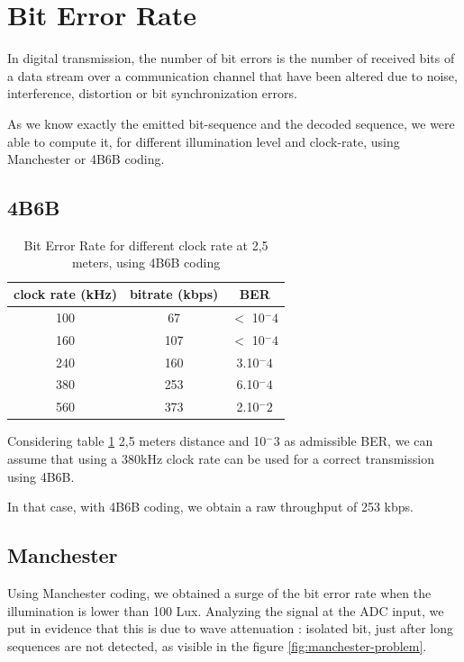 \section{Bit Error Rate}

In digital transmission, the number of bit errors is the number of received bits of a data stream over a communication channel that have been altered due to noise, interference, distortion or bit synchronization errors.

As we know exactly the emitted bit-sequence and the decoded sequence, we were able to compute it, for different illumination level and clock-rate, using Manchester or 4B6B coding.

\subsection{4B6B}

\begin{table}[htbp]
\begin{center}
\begin{tabular}{|c|c|c|}
  \hline
  clock rate (kHz) & bitrate (kbps) & BER \\
  \hline
  100 & 67 & $<$ 10$^-4$ \\
  160 & 107 & $<$ 10$^-4$ \\
  240 & 160 & 3.10$^-4$ \\
  380 & 253 & 6.10$^-4$ \\
  560 & 373 & 2.10$^-2$ \\
  \hline
\end{tabular}
\end{center}
\caption{Bit Error Rate for different clock rate at 2,5 meters, using 4B6B coding}
\label{tab:ber}
\end{table}

Considering table \ref{tab:ber} 2,5 meters distance and 10$^-3$ as admissible BER, we can assume that using a 380kHz clock rate can be used for a correct transmission using 4B6B.

In that case, with 4B6B coding, we obtain a raw throughput of 253 kbps.

\subsection{Manchester}
Using Manchester coding, we obtained a surge of the bit error rate when the illumination is lower than 100 Lux. Analyzing the signal at the ADC input, we put in evidence that this is due to wave attenuation : isolated bit, just after long sequences are not detected, as visible in the figure \ref{fig:manchester-problem}.

